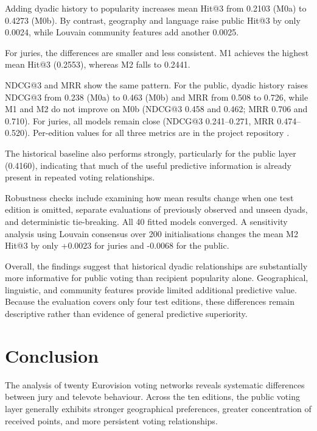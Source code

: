 \documentclass[12pt,a4paper]{article}
\begin{document}
Adding dyadic history to popularity increases
mean Hit@3 from 0.2103 (M0a) to 0.4273 (M0b).
By contrast, geography and language raise
public Hit@3 by only 0.0024, while Louvain
community features add another 0.0025.

For juries, the differences are smaller and
less consistent. M1 achieves the highest mean
Hit@3 (0.2553), whereas M2 falls to 0.2441.

NDCG@3 and MRR show the same pattern. For the public, dyadic
history raises NDCG@3 from 0.238 (M0a) to 0.463 (M0b) and MRR
from 0.508 to 0.726, while M1 and M2 do not improve on M0b
(NDCG@3 0.458 and 0.462; MRR 0.706 and 0.710). For juries,
all models remain close (NDCG@3 0.241--0.271, MRR
0.474--0.520). Per-edition values for all three metrics are
in the project repository \cite{projectrepo}.

The historical baseline also performs strongly,
particularly for the public layer (0.4160),
indicating that much of the useful predictive
information is already present in repeated
voting relationships.

Robustness checks include examining how mean results
change when one test edition is omitted, separate
evaluations of previously
observed and unseen dyads, and deterministic
tie-breaking. All 40 fitted models converged.
A sensitivity analysis using Louvain consensus
over 200 initialisations changes the mean M2
Hit@3 by only +0.0023 for juries and -0.0068
for the public.

Overall, the findings suggest that historical
dyadic relationships are substantially more
informative for public voting than recipient
popularity alone. Geographical, linguistic,
and community features provide limited
additional predictive value. Because the
evaluation covers only four test editions,
these differences remain descriptive rather
than evidence of general predictive superiority.


\section{Conclusion}
\label{conclusion}

The analysis of twenty Eurovision voting networks
reveals systematic differences between jury and
televote behaviour. Across the ten editions,
the public voting layer generally exhibits
stronger geographical preferences, greater
concentration of received points, and more
persistent voting relationships.
\end{document}
